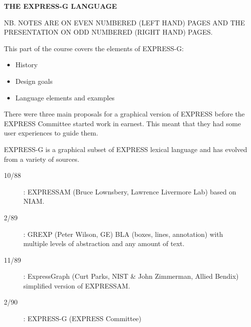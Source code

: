 
%
%


\pagestyle{empty}
\bodsiz

\vspace*{\beftit}
\begin{center}
{\titsiz \textbf{THE EXPRESS-G LANGUAGE}}
\end{center}
\vspace{\beftit}
\vspace{\beftit}
\begin{center}
\end{center}

\clearpage

\ifnotes
  \pagestyle{plain}
\else
  \pagestyle{empty}
\fi

\begin{remarks}
\remintro
NB. NOTES ARE ON EVEN NUMBERED (LEFT HAND) PAGES AND THE PRESENTATION ON
ODD NUMBERED (RIGHT HAND) PAGES.


This part of the course covers the elements of EXPRESS-G:
\begin{itemize}
\item History
\item Design goals
\item Language elements and examples
\end{itemize}

    There were three main proposals for a graphical version of
EXPRESS before the EXPRESS Committee started work in earnest. This meant
that they had some user experiences to guide them.

\remend
\end{remarks}


    EXPRESS-G is a graphical subset of EXPRESS lexical language and 
has evolved from a variety of sources.

\begin{description}
\item[10/88]: EXPRESSAM (Bruce Lownsbery, Lawrence Livermore Lab) 
              based on NIAM.
\item[2/89]: GREXP (Peter Wilson, GE) BLA  (boxes, lines, annotation) with
             multiple levels of abstraction and any amount of text.
\item[11/89]: ExpressGraph (Curt Parks, NIST \& John Zimmerman, Allied Bendix) 
              simplified version of EXPRESSAM.
\item[2/90]: EXPRESS-G (EXPRESS Committee) 
\end{description}

